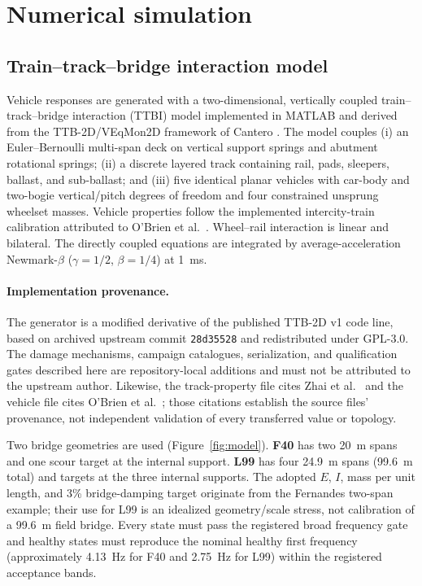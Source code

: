 \section{Numerical simulation}
\label{sec:simulation}

\subsection{Train--track--bridge interaction model}
\label{sec:ttbi}

Vehicle responses are generated with a two-dimensional, vertically coupled
train--track--bridge interaction (TTBI) model implemented in MATLAB and derived
from the TTB-2D/VEqMon2D framework of Cantero
\cite{cantero_ttb2d, cantero2022veqmon}. The model couples (i) an
Euler--Bernoulli multi-span deck on vertical support springs and abutment
rotational springs; (ii) a discrete layered track containing rail, pads,
sleepers, ballast, and sub-ballast; and (iii) five identical planar vehicles
with car-body and two-bogie vertical/pitch degrees of freedom and four
constrained unsprung wheelset masses. Vehicle properties follow the
implemented intercity-train calibration attributed to O'Brien et
al.~\cite{obrien2018vehicle}. Wheel--rail interaction is linear and bilateral.
The directly coupled equations are integrated by average-acceleration
Newmark-$\beta$ ($\gamma=1/2$, $\beta=1/4$) at 1~ms.

\paragraph{Implementation provenance.}
The generator is a modified derivative of the published TTB-2D v1 code line,
based on archived upstream commit \texttt{28d35528} and redistributed under
GPL-3.0. The damage mechanisms, campaign catalogues, serialization, and
qualification gates described here are repository-local additions and must not
be attributed to the upstream author. Likewise, the track-property file cites
Zhai et al.~\cite{zhai2004track} and the vehicle file cites O'Brien et
al.~\cite{obrien2018vehicle}; those citations establish the source files'
provenance, not independent validation of every transferred value or topology.

Two bridge geometries are used (Figure~\ref{fig:model}). \textbf{F40} has two
20~m spans and one scour target at the internal support. \textbf{L99} has four
24.9~m spans (99.6~m total) and targets at the three internal supports. The
adopted $E$, $I$, mass per unit length, and 3\% bridge-damping target originate
from the Fernandes two-span example; their use for L99 is an idealized
geometry/scale stress, not calibration of a 99.6~m field bridge. Every state
must pass the registered broad frequency gate and healthy states must reproduce
the nominal healthy first frequency (approximately 4.13~Hz for F40 and
2.75~Hz for L99) within the registered acceptance bands.

